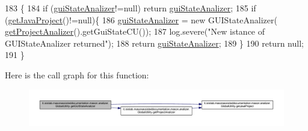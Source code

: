 \begin{DoxyCode}
183                                                         \{
184         \textcolor{keywordflow}{if} (\hyperlink{classit_1_1isislab_1_1masonassisteddocumentation_1_1mason_1_1analizer_1_1_global_utility_a21d75c0d0c0cf2c10af5c0549175d5a0}{guiStateAnalizer}!=null) \textcolor{keywordflow}{return} \hyperlink{classit_1_1isislab_1_1masonassisteddocumentation_1_1mason_1_1analizer_1_1_global_utility_a21d75c0d0c0cf2c10af5c0549175d5a0}{guiStateAnalizer};
185         \textcolor{keywordflow}{if} (\hyperlink{classit_1_1isislab_1_1masonassisteddocumentation_1_1mason_1_1analizer_1_1_global_utility_ab1fa2a5ac258d0119ca7d486261c01fb}{getJavaProject}()!=null)\{
186             \hyperlink{classit_1_1isislab_1_1masonassisteddocumentation_1_1mason_1_1analizer_1_1_global_utility_a21d75c0d0c0cf2c10af5c0549175d5a0}{guiStateAnalizer} = \textcolor{keyword}{new} GUIStateAnalizer(
      \hyperlink{classit_1_1isislab_1_1masonassisteddocumentation_1_1mason_1_1analizer_1_1_global_utility_a78cbdc6022c558d1375a01095ad95659}{getProjectAnalizer}().getGuiStateCU());        
187             log.severe(\textcolor{stringliteral}{"New istance of GUIStateAnalizer returned"});
188             \textcolor{keywordflow}{return} \hyperlink{classit_1_1isislab_1_1masonassisteddocumentation_1_1mason_1_1analizer_1_1_global_utility_a21d75c0d0c0cf2c10af5c0549175d5a0}{guiStateAnalizer};
189         \}
190         \textcolor{keywordflow}{return} null;
191     \}
\end{DoxyCode}


Here is the call graph for this function\-:
\nopagebreak
\begin{figure}[H]
\begin{center}
\leavevmode
\includegraphics[width=350pt]{classit_1_1isislab_1_1masonassisteddocumentation_1_1mason_1_1analizer_1_1_global_utility_a360598554ec1ca25ec7d4b78679b5bcd_cgraph}
\end{center}
\end{figure}


